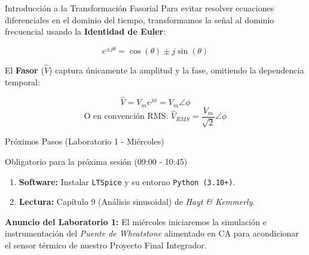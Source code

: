 \documentclass[aspectratio=169, 10pt]{beamer}
\begin{document}
\begin{frame}{Introducción a la Transformación Fasorial}
    Para evitar resolver ecuaciones diferenciales en el dominio del tiempo, transformamos la señal al dominio frecuencial usando la \textbf{Identidad de Euler}:
    
    \begin{equation*}
        e^{\pm j\theta} = \cos(\theta) \pm j\sin(\theta)
    \end{equation*}
    
    El \textbf{Fasor} ($\hat{V}$) captura únicamente la amplitud y la fase, omitiendo la dependencia temporal:
    
    \begin{equation*}
        \hat{V} = V_m e^{j\phi} = V_m \angle \phi
    \end{equation*}
    \begin{equation*}
        \text{O en convención RMS: } \hat{V}_{RMS} = \frac{V_m}{\sqrt{2}} \angle \phi
    \end{equation*}
\end{frame}

\begin{frame}{Próximos Pasos (Laboratorio 1 - Miércoles)}
    \begin{block}{Obligatorio para la próxima sesión (09:00 - 10:45)}
        \begin{enumerate}
            \item \textbf{Software:} Instalar \texttt{LTSpice} y su entorno \texttt{Python (3.10+)}.
            \item \textbf{Lectura:} Capítulo 9 (Análisis sinusoidal) de \textit{Hayt \& Kemmerly}.
        \end{enumerate}
    \end{block}
    
    \vspace{0.3cm}
    \textbf{Anuncio del Laboratorio 1:}
    El miércoles iniciaremos la simulación e instrumentación del \textit{Puente de Wheatstone} alimentado en CA para acondicionar el sensor térmico de nuestro Proyecto Final Integrador.
\end{frame}
\end{document}
